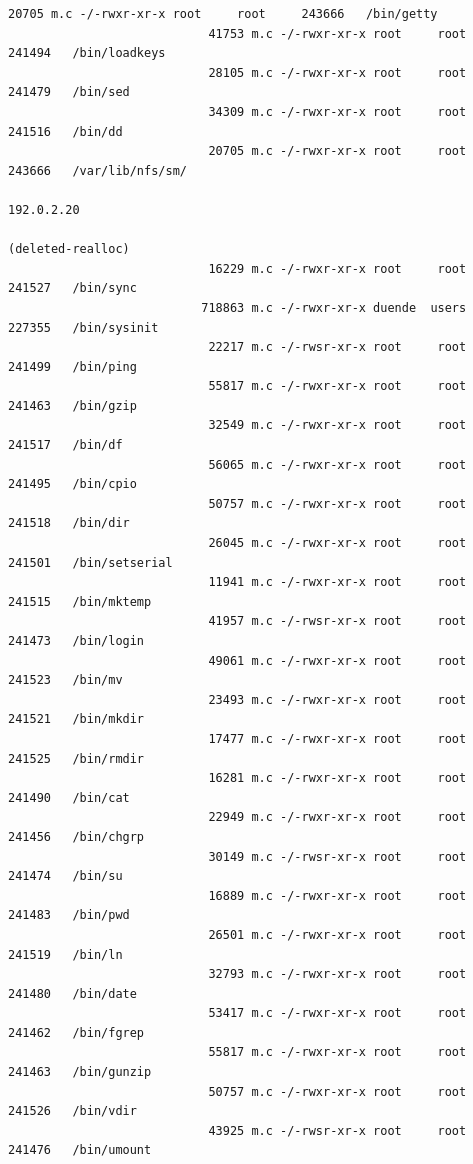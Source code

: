 {\begin{lstlisting}[style=terminal]
                            20705 m.c -/-rwxr-xr-x root     root     243666   /bin/getty
                            41753 m.c -/-rwxr-xr-x root     root     241494   /bin/loadkeys
                            28105 m.c -/-rwxr-xr-x root     root     241479   /bin/sed
                            34309 m.c -/-rwxr-xr-x root     root     241516   /bin/dd
                            20705 m.c -/-rwxr-xr-x root     root     243666   /var/lib/nfs/sm/
                                                                              192.0.2.20 
                                                                              (deleted-realloc)
                            16229 m.c -/-rwxr-xr-x root     root     241527   /bin/sync
                           718863 m.c -/-rwxr-xr-x duende  users    227355   /bin/sysinit
                            22217 m.c -/-rwsr-xr-x root     root     241499   /bin/ping
                            55817 m.c -/-rwxr-xr-x root     root     241463   /bin/gzip
                            32549 m.c -/-rwxr-xr-x root     root     241517   /bin/df
                            56065 m.c -/-rwxr-xr-x root     root     241495   /bin/cpio
                            50757 m.c -/-rwxr-xr-x root     root     241518   /bin/dir
                            26045 m.c -/-rwxr-xr-x root     root     241501   /bin/setserial
                            11941 m.c -/-rwxr-xr-x root     root     241515   /bin/mktemp
                            41957 m.c -/-rwsr-xr-x root     root     241473   /bin/login
                            49061 m.c -/-rwxr-xr-x root     root     241523   /bin/mv
                            23493 m.c -/-rwxr-xr-x root     root     241521   /bin/mkdir
                            17477 m.c -/-rwxr-xr-x root     root     241525   /bin/rmdir
                            16281 m.c -/-rwxr-xr-x root     root     241490   /bin/cat
                            22949 m.c -/-rwxr-xr-x root     root     241456   /bin/chgrp
                            30149 m.c -/-rwsr-xr-x root     root     241474   /bin/su
                            16889 m.c -/-rwxr-xr-x root     root     241483   /bin/pwd
                            26501 m.c -/-rwxr-xr-x root     root     241519   /bin/ln
                            32793 m.c -/-rwxr-xr-x root     root     241480   /bin/date
                            53417 m.c -/-rwxr-xr-x root     root     241462   /bin/fgrep
                            55817 m.c -/-rwxr-xr-x root     root     241463   /bin/gunzip
                            50757 m.c -/-rwxr-xr-x root     root     241526   /bin/vdir
                            43925 m.c -/-rwsr-xr-x root     root     241476   /bin/umount

\end{lstlisting}}
